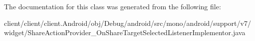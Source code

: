 The documentation for this class was generated from the following file\+:\begin{DoxyCompactItemize}
\item 
client/client/client.\+Android/obj/\+Debug/android/src/mono/android/support/v7/widget/Share\+Action\+Provider\+\_\+\+On\+Share\+Target\+Selected\+Listener\+Implementor.\+java\end{DoxyCompactItemize}
